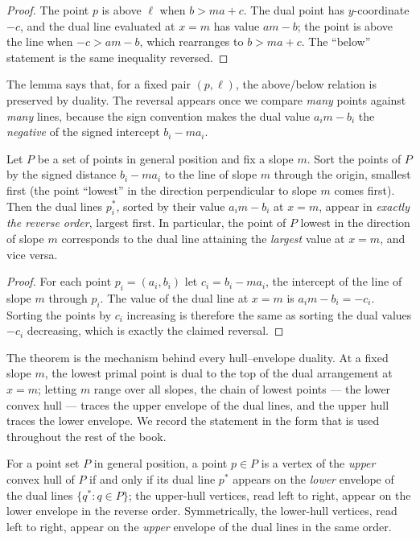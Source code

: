 \begin{proof}
  The point $p$ is above $\ell$ when $b > ma + c$. The dual point has
  $y$-coordinate $-c$, and the dual line evaluated at $x = m$ has value
  $am - b$; the point is above the line when $-c > am - b$, which
  rearranges to $b > ma + c$. The ``below'' statement is the same
  inequality reversed.
\end{proof}

The lemma says that, for a fixed pair $(p, \ell)$, the above/below relation
is preserved by duality. The reversal appears once we compare \emph{many}
points against \emph{many} lines, because the sign convention makes the
dual value $a_i m - b_i$ the \emph{negative} of the signed intercept
$b_i - ma_i$.

\begin{theorem}\label{thm:geo_duality_order_reversal}
  Let $P$ be a set of points in general position and fix a slope $m$. Sort
  the points of $P$ by the signed distance $b_i - m a_i$ to the line of
  slope $m$ through the origin, smallest first (the point ``lowest'' in the
  direction perpendicular to slope $m$ comes first). Then the dual lines
  $p_i^*$, sorted by their value $a_i m - b_i$ at $x = m$, appear in
  \emph{exactly the reverse order}, largest first. In particular, the point
  of $P$ lowest in the direction of slope $m$ corresponds to the dual line
  attaining the \emph{largest} value at $x = m$, and vice versa.
\end{theorem}

\begin{proof}
  For each point $p_i = (a_i, b_i)$ let $c_i = b_i - m a_i$, the intercept of
  the line of slope $m$ through $p_i$. The value of the dual line at
  $x = m$ is $a_i m - b_i = -c_i$. Sorting the points by $c_i$ increasing
  is therefore the same as sorting the dual values $-c_i$ decreasing, which
  is exactly the claimed reversal.
\end{proof}

The theorem is the mechanism behind every hull--envelope duality. At a fixed
slope $m$, the lowest primal point is dual to the top of the dual
arrangement at $x = m$; letting $m$ range over all slopes, the chain of
lowest points --- the lower convex hull --- traces the upper envelope of the
dual lines, and the upper hull traces the lower envelope. We record the
statement in the form that is used throughout the rest of the book.

\begin{corollary}\label{cor:geo_duality_hull_envelope}
  For a point set $P$ in general position, a point $p \in P$ is a vertex of
  the \emph{upper} convex hull of $P$ if and only if its dual line $p^*$
  appears on the \emph{lower} envelope of the dual lines $\{q^* : q \in
  P\}$; the upper-hull vertices, read left to right, appear on the lower
  envelope in the reverse order. Symmetrically, the lower-hull vertices,
  read left to right, appear on the \emph{upper} envelope of the dual lines
  in the same order.
\end{corollary}

